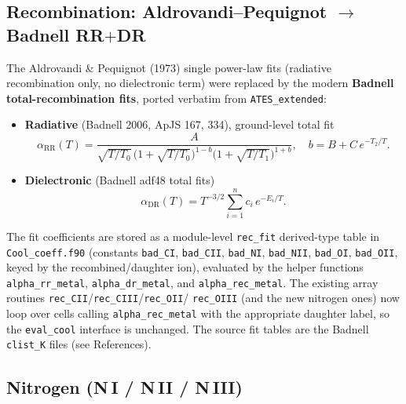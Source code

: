 \documentclass[english,a4paper]{kiseon_memo}
\begin{document}
\subsection{Recombination: Aldrovandi--Pequignot $\rightarrow$ Badnell
RR$+$DR}

The Aldrovandi \& Pequignot (1973) single power-law fits
(radiative recombination only, no dielectronic term) were replaced by
the modern \textbf{Badnell total-recombination fits}, ported verbatim
from \texttt{ATES\_extended}:
\begin{itemize}
  \item \textbf{Radiative} (Badnell 2006, ApJS 167, 334), ground-level
    total fit
    \[
      \alpha_{\mathrm{RR}}(T) = \frac{A}
      {\sqrt{T/T_0}\,\bigl(1+\sqrt{T/T_0}\bigr)^{1-b}
                     \bigl(1+\sqrt{T/T_1}\bigr)^{1+b}},
      \quad b = B + C\,e^{-T_2/T}.
    \]
  \item \textbf{Dielectronic} (Badnell adf48 total fits)
    \[
      \alpha_{\mathrm{DR}}(T) = T^{-3/2}
      \sum_{i=1}^{n} c_i\,e^{-E_i/T}.
    \]
\end{itemize}
The fit coefficients are stored as a module-level \texttt{rec\_fit}
derived-type table in \texttt{Cool\_coeff.f90} (constants
\texttt{bad\_CI}, \texttt{bad\_CII}, \texttt{bad\_NI}, \texttt{bad\_NII},
\texttt{bad\_OI}, \texttt{bad\_OII}, keyed by the recombined/daughter
ion), evaluated by the helper functions \texttt{alpha\_rr\_metal},
\texttt{alpha\_dr\_metal}, and \texttt{alpha\_rec\_metal}.  The existing
array routines \texttt{rec\_CII}/\texttt{rec\_CIII}/\texttt{rec\_OII}/%
\texttt{rec\_OIII} (and the new nitrogen ones) now loop over cells
calling \texttt{alpha\_rec\_metal} with the appropriate daughter label,
so the \texttt{eval\_cool} interface is unchanged.  The source fit
tables are the Badnell \texttt{clist\_K} files (see References).

\subsection{Nitrogen (N\,I / N\,II / N\,III)}
\end{document}

